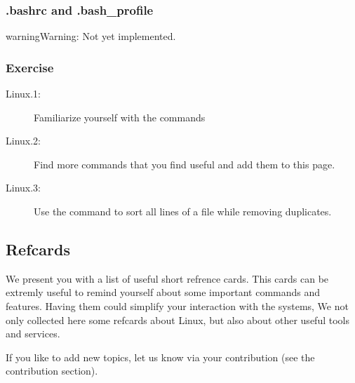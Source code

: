 \subsubsection{.bashrc and .bash\_profile}
\label{\detokenize{lesson/linux/linux:bashrc}}\label{\detokenize{lesson/linux/linux:bashrc-and-bash-profile}}
\begin{sphinxadmonition}{warning}{Warning:}
Not yet implemented.
\end{sphinxadmonition}


\subsubsection{Exercise}
\label{\detokenize{lesson/linux/linux:exercise}}\begin{description}
\item[{Linux.1:}] \leavevmode
Familiarize yourself with the commands

\item[{Linux.2:}] \leavevmode
Find more commands that you find useful and add them to this page.

\item[{Linux.3:}] \leavevmode
Use the  command to sort all lines of a file while removing duplicates.

\end{description}


\subsection{Refcards}
\label{\detokenize{lesson/linux/refcards:refcards}}\label{\detokenize{lesson/linux/refcards::doc}}
We present you with a list of useful short refrence cards. This cards
can be extremly useful to remind yourself about some important
commands and features. Having them could simplify your interaction
with the systems, We not only collected here some refcards about
Linux, but also about other useful tools and services.

If you like to add new topics, let us know via your contribution (see
the contribution section).

